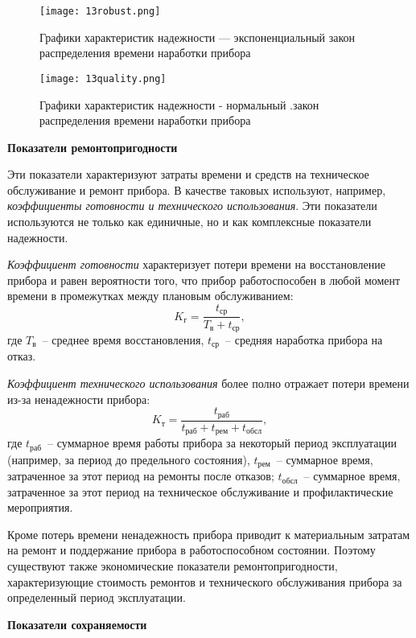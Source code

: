 \begin{figure}[h!]
	\caption{ Графики характеристик надежности --- экспоненциальный закон распределения времени наработки прибора }
	\texttt{[image: 13robust.png]}
	\label{pic:13robust}
\end{figure}

\begin{figure}[h!]
	\caption{ Графики характеристик надежности - нормальный .закон распределения времени наработки прибора }
	\texttt{[image: 13quality.png]}
	\label{pic:13quality}
\end{figure}

\begin{flushleft}
\textbf{Показатели ремонтопригодности}
\end{flushleft}

Эти показатели характеризуют затраты времени и средств на техническое обслуживание и ремонт прибора. В качестве таковых используют, например, \textit{коэффициенты готовности и технического использования}. Эти показатели используются не только как единичные, но и как комплексные показатели надежности.

\textit{Коэффициент готовности} характеризует потери времени на восстановление прибора и равен вероятности того, что прибор работоспособен в любой момент времени в промежутках между плановым обслуживанием:
\[ K_\text{г} = \dfrac{t_\text{ср}}{T_\text{в} + t_\text{ср}}, \]
где $ T_\text{в} $~-- среднее время восстановления, $ t_\text{ср} $~-- средняя наработка прибора на отказ.

\textit{Коэффициент технического использования} более полно отражает потери времени из-за ненадежности прибора:
\[ K_\text{т} = \dfrac{t_\text{раб}}{t_\text{раб} + t_\text{рем} + t_\text{обсл}}, \]
где $ t_\text{раб} $~-- суммарное время работы прибора за некоторый период эксплуатации (например, за период до предельного состояния), $ t_\text{рем} $~-- суммарное время, затраченное за этот период на ремонты после отказов; $ t_\text{обсл} $~-- суммарное время, затраченное за этот период на техническое обслуживание и профилактические мероприятия.

Кроме потерь времени ненадежность прибора приводит к материальным затратам на ремонт и поддержание прибора в работоспособном состоянии. Поэтому существуют также экономические показатели ремонтопригодности, характеризующие стоимость ремонтов и технического обслуживания прибора за определенный период эксплуатации.

\begin{flushleft}
\textbf{Показатели сохраняемости}
\end{flushleft}

